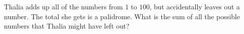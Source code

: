 Thalia adds up all of the numbers from $1$ to $100$, but accidentally leaves out a number. The total she gets  is a palidrome. What is the sum of all the possible numbers that Thalia might have left out?
